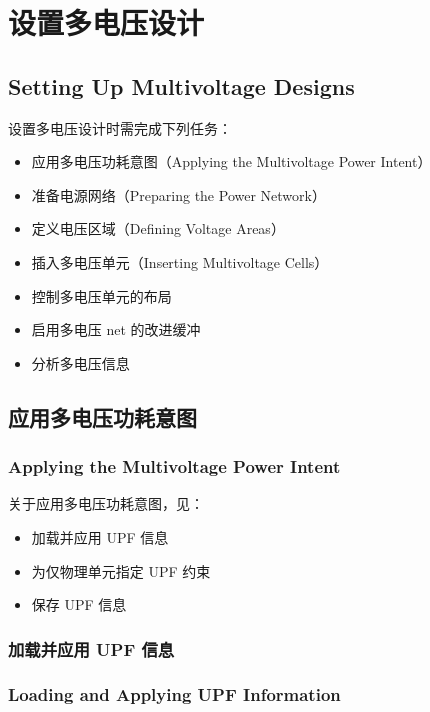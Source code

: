 \section{设置多电压设计}
\subsection*{Setting Up Multivoltage Designs}

设置多电压设计时需完成下列任务：
\begin{itemize}
  \item 应用多电压功耗意图（Applying the Multivoltage Power Intent）
  \item 准备电源网络（Preparing the Power Network）
  \item 定义电压区域（Defining Voltage Areas）
  \item 插入多电压单元（Inserting Multivoltage Cells）
  \item 控制多电压单元的布局
  \item 启用多电压 net 的改进缓冲
  \item 分析多电压信息
\end{itemize}

\subsection{应用多电压功耗意图}
\subsubsection*{Applying the Multivoltage Power Intent}

关于应用多电压功耗意图，见：
\begin{itemize}
  \item 加载并应用 UPF 信息
  \item 为仅物理单元指定 UPF 约束
  \item 保存 UPF 信息
\end{itemize}

\subsubsection{加载并应用 UPF 信息}
\subsubsection*{Loading and Applying UPF Information}

